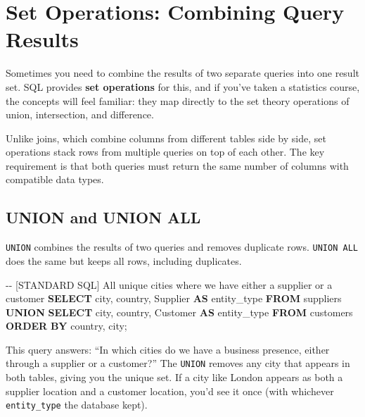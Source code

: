 \documentclass[
  letterpaper,
  DIV=11,
  numbers=noendperiod]{scrreprt}
\newenvironment{Shaded}{\begin{snugshade}}{\end{snugshade}}
\newcommand{\CommentTok}[1]{\textcolor[rgb]{0.37,0.37,0.37}{#1}}
\newcommand{\KeywordTok}[1]{\textcolor[rgb]{0.00,0.23,0.31}{\textbf{#1}}}
\newcommand{\NormalTok}[1]{\textcolor[rgb]{0.00,0.23,0.31}{#1}}
\newcommand{\StringTok}[1]{\textcolor[rgb]{0.13,0.47,0.30}{#1}}
\begin{document}
\section{Set Operations: Combining Query
Results}\label{set-operations-combining-query-results}

Sometimes you need to combine the results of two separate queries into
one result set. SQL provides \textbf{set operations} for this, and if
you've taken a statistics course, the concepts will feel familiar: they
map directly to the set theory operations of union, intersection, and
difference.

Unlike joins, which combine columns from different tables side by side,
set operations stack rows from multiple queries on top of each other.
The key requirement is that both queries must return the same number of
columns with compatible data types.

\subsection{UNION and UNION ALL}\label{union-and-union-all}

\texttt{UNION} combines the results of two queries and removes duplicate
rows. \texttt{UNION\ ALL} does the same but keeps all rows, including
duplicates.

\begin{codelisting}

\caption{\texttt{duckdb}}

\begin{Shaded}
\begin{Highlighting}[]
\CommentTok{{-}{-} [STANDARD SQL] All unique cities where we have either a supplier or a customer}
\KeywordTok{SELECT}\NormalTok{ city, country, }\StringTok{\textquotesingle{}Supplier\textquotesingle{}} \KeywordTok{AS}\NormalTok{ entity\_type}
\KeywordTok{FROM}\NormalTok{ suppliers}
\KeywordTok{UNION}
\KeywordTok{SELECT}\NormalTok{ city, country, }\StringTok{\textquotesingle{}Customer\textquotesingle{}} \KeywordTok{AS}\NormalTok{ entity\_type}
\KeywordTok{FROM}\NormalTok{ customers}
\KeywordTok{ORDER} \KeywordTok{BY}\NormalTok{ country, city;}
\end{Highlighting}
\end{Shaded}

\end{codelisting}

This query answers: ``In which cities do we have a business presence,
either through a supplier or a customer?'' The \texttt{UNION} removes
any city that appears in both tables, giving you the unique set. If a
city like London appears as both a supplier location and a customer
location, you'd see it once (with whichever \texttt{entity\_type} the
database kept).
\end{document}
